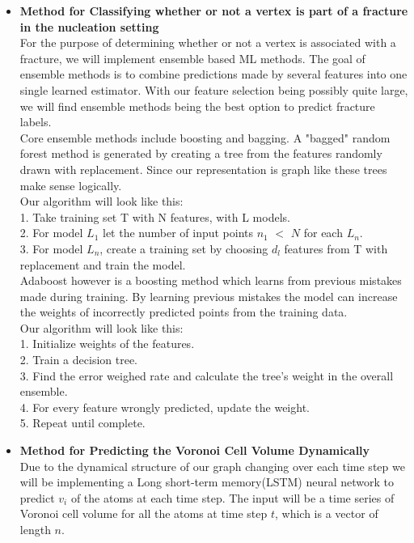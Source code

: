 \begin{itemize}
\begin{itemize}
\bigskip
\item \textbf{Method for Classifying whether or not a vertex is part of a fracture in the nucleation setting}
\bigskip
\\
For the purpose of determining whether or not a vertex is associated with a fracture, we will implement ensemble based ML methods. The goal of ensemble methods is to combine predictions made by several features into one single learned estimator. With our feature selection being possibly quite large, we will find ensemble methods being the best option to predict fracture labels. 
\bigskip
\\
Core ensemble methods include boosting and bagging. A "bagged" random forest method is generated by creating a tree from the features randomly drawn with replacement. Since our representation is graph like these trees make sense logically. 
\bigskip
\\
Our algorithm will look like this:
\\
1. Take training set T with N features, with L models.
\\
2. For model $L _{1}$ let the number of input points $n_{1}$ $<$ $N$ for each $L_{n}$.
\\
3. For model $L_{n}$, create a training set by choosing $d_{l}$ features from T with replacement and train the model.
\bigskip
\\
Adaboost however is a boosting method which learns from previous mistakes made during training. By learning previous mistakes the model can increase the weights of incorrectly predicted points from the training data. 
\bigskip
\\
Our algorithm will look like this:
\\
1. Initialize weights of the features. 
\\
2. Train a decision tree.
\\
3. Find the error weighed rate and calculate the tree's weight in the overall ensemble. 
\\
4. For every feature wrongly predicted, update the weight. 
\\
5. Repeat until complete. 
\newpage
\item \textbf{Method for Predicting the Voronoi Cell Volume Dynamically}
\bigskip
\\
Due to the dynamical structure of our graph changing over each time step we will be implementing a Long short-term memory(LSTM) neural network to predict $v_i$ of the atoms at each time step. The input will be a time series of Voronoi cell volume for all the atoms at time step $t$, which is a vector of length $n$.


\end{itemize}
\end{itemize}
